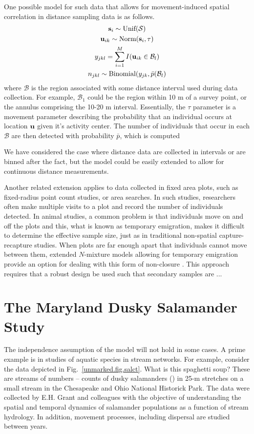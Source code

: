 One possible model for such data that allows for movement-induced spatial
correlation in distance sampling data is as follows.
\begin{gather*}
  {\bf s}_i \sim \text{Unif}(\mathcal{S}) \\
  {\bf u}_{ik} \sim \text{Norm}({\bf s}_i, \tau) \\
  y_{jkl} = \sum_{i=1}^M I({\bf u}_{ik} \in \mathcal{B}_l) \\
  n_{jkl} \sim \text{Binomial}(y_{jk}, \bar{p}(\mathcal{B}_l)
\end{gather*}
where $\mathcal{B}$ is the region associated with some distance
interval used during data collection. For example, $\mathcal{B}_1$
could be the region within 10 m of a survey point, or the annulus
comprising the 10-20 m interval. Essentially, the $\tau$ parameter is
a movement parameter describing the probability that an individual
occurs at location $\bf u$ given it's activity center. The number of
individuals that occur in each $\mathcal{B}$ are then detected with
probability $\bar{p}$, which is computed

We have considered the case where distance data are collected in
intervals or are binned after the fact, but the model could be easily
extended to allow for continuous distance measurements.

Another
related extension applies to data collected in fixed area plots, such
as fixed-radius point count studies, or area searches. In such
studies, researchers often make multiple visits to a plot and record
the number of individuals detected. In animal studies, a common
problem is that individuals move on and off the plots and this, what
is known as temporary emigration, makes it difficult to determine the
effective sample size, just as in traditional non-spatial
capture-recapture studies. When plots are far enough apart that
individuals cannot move between them, extended $N$-mixture models
allowing for temporary emigration provide an option for dealing with
this form of non-closure \citep{chandler_etal:2011}. This approach
requires that a robust design be used such that secondary samples are
...

\section{The Maryland Dusky Salamander Study}

The independence assumption of the \citet{chandler_etal:2011} model
will not hold in some cases. A prime example is in studies of aquatic
species in stream networks. For example, consider the data depicted in
Fig.~\ref{unmarked.fig.salct}. What is this spaghetti soup? These
are streams of numbers -- counts of dusky salamanders
(\textit{}) in 25-m stretches on a small stream in the Chesapeake and
Ohio National Historick Park. The data were collected by E.H. Grant
and colleagues with the objective of understanding the spatial and
temporal dynamics of salamander populations as a function of stream
hydrology. In addition, movement processes, including dispersal are
studied between years.

